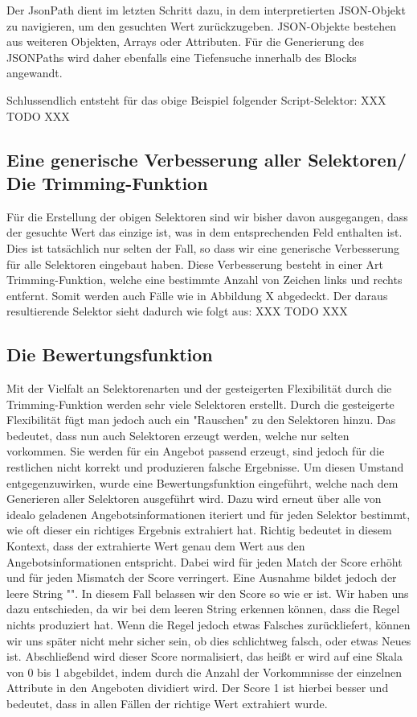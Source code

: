Der JsonPath dient im letzten Schritt dazu, in dem interpretierten JSON-Objekt zu navigieren, um den gesuchten Wert
zurückzugeben.
JSON-Objekte bestehen aus weiteren Objekten, Arrays oder Attributen.
Für die Generierung des JSONPaths wird daher ebenfalls eine Tiefensuche innerhalb des Blocks angewandt.

Schlussendlich entsteht für das obige Beispiel folgender Script-Selektor:
XXX TODO XXX

\subsection{Eine generische Verbesserung aller Selektoren/ Die Trimming-Funktion}
\label{subsec:generische-verbesserung}

Für die Erstellung der obigen Selektoren sind wir bisher davon ausgegangen, dass der gesuchte Wert das einzige ist,
was in dem entsprechenden Feld enthalten ist.
Dies ist tatsächlich nur selten der Fall, so dass wir eine generische Verbesserung für alle Selektoren eingebaut haben.
Diese Verbesserung besteht in einer Art Trimming-Funktion, welche eine bestimmte Anzahl von Zeichen links und rechts
entfernt.
Somit werden auch Fälle wie in Abbildung X abgedeckt.
Der daraus resultierende Selektor sieht dadurch wie folgt aus:
XXX TODO XXX

\subsection{Die Bewertungsfunktion}
\label{subsec:bewertungsfunktion}

Mit der Vielfalt an Selektorenarten und der gesteigerten Flexibilität durch die Trimming-Funktion werden sehr viele
Selektoren erstellt.
Durch die gesteigerte Flexibilität fügt man jedoch auch ein "Rauschen" zu den Selektoren hinzu.
Das bedeutet, dass nun auch Selektoren erzeugt werden, welche nur selten vorkommen.
Sie werden für ein Angebot passend erzeugt, sind jedoch für die restlichen nicht korrekt und produzieren falsche
Ergebnisse.
Um diesen Umstand entgegenzuwirken, wurde eine Bewertungsfunktion eingeführt, welche nach dem Generieren aller
Selektoren ausgeführt wird.
Dazu wird erneut über alle von idealo geladenen Angebotsinformationen iteriert und für jeden Selektor bestimmt, wie
oft dieser ein richtiges Ergebnis extrahiert hat.
Richtig bedeutet in diesem Kontext, dass der extrahierte Wert genau dem Wert aus den Angebotsinformationen entspricht.
Dabei wird für jeden Match der Score erhöht und für jeden Mismatch der Score verringert.
Eine Ausnahme bildet jedoch der leere String "".
In diesem Fall belassen wir den Score so wie er ist.
Wir haben uns dazu entschieden, da wir bei dem leeren String erkennen können, dass die Regel nichts produziert hat.
Wenn die Regel jedoch etwas Falsches zurückliefert, können wir uns später nicht mehr sicher sein, ob dies schlichtweg
falsch, oder etwas Neues ist.
Abschließend wird dieser Score normalisiert, das heißt er wird auf eine Skala von 0 bis 1 abgebildet, indem durch die
Anzahl der Vorkommnisse der einzelnen Attribute in den Angeboten dividiert wird.
Der Score 1 ist hierbei besser und bedeutet, dass in allen Fällen der richtige Wert extrahiert wurde.

